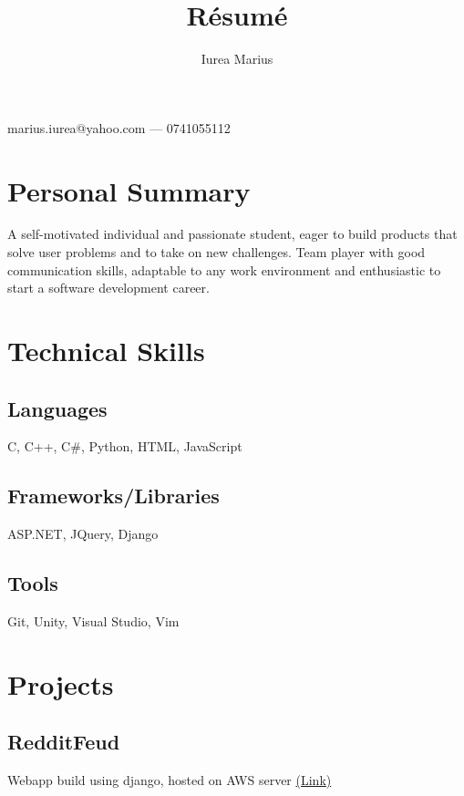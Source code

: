 \documentclass[a4paper,hidelinks,8pt]{article}
\begin{document}
\title{R\'esum\'e}
\author{Iurea Marius}
\renewcommand{\maketitle}
{
        \begin{center}
        {\huge\bfseries
        \thetitle

        \theauthor}

        marius.iurea@yahoo.com --- 0741055112

        \end{center}
}

\maketitle

\section{Personal Summary}
A self-motivated individual and passionate student, eager to build products that solve user problems and to take on new challenges.
Team player with good communication skills, adaptable to any work environment and enthusiastic to start a software
development career.
\section{Technical Skills}
\subsection{Languages}
C, C++, C\#, Python, HTML, JavaScript
\subsection{Frameworks/Libraries}
ASP.NET, JQuery, Django
\subsection{Tools}
Git, Unity, Visual Studio, Vim
\section{Projects}
\subsection{RedditFeud}
Webapp build using django, hosted on AWS server \href{https:\\www.redditfeud.com}{(Link)}
\end{document}
